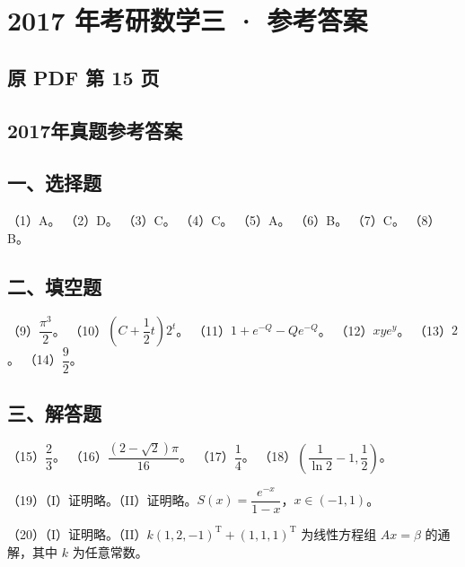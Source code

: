 \documentclass[UTF8,12pt]{ctexart}
\begin{document}
\section*{2017 年考研数学三 · 参考答案}
\subsection*{原 PDF 第 15 页}

\subsection*{2017年真题参考答案}

\subsection*{一、选择题}

（1）A。 （2）D。 （3）C。 （4）C。 （5）A。 （6）B。 （7）C。 （8）B。


\subsection*{二、填空题}

（9）\(\displaystyle \dfrac{\displaystyle \pi^3}{\displaystyle 2}\)。 （10）\(\displaystyle (C+\dfrac{\displaystyle 1}{\displaystyle 2}t)2^t\)。 （11）\(\displaystyle 1+e^{-Q}-Qe^{-Q}\)。 （12）\(\displaystyle xye^y\)。 （13）\(\displaystyle 2\)。 （14）\(\displaystyle \dfrac{\displaystyle 9}{\displaystyle 2}\)。


\subsection*{三、解答题}

（15）\(\displaystyle \dfrac{\displaystyle 2}{\displaystyle 3}\)。 （16）\(\displaystyle \dfrac{\displaystyle (2-\sqrt2)\pi}{\displaystyle 16}\)。 （17）\(\displaystyle \dfrac{\displaystyle 1}{\displaystyle 4}\)。 （18）\(\displaystyle (\dfrac{\displaystyle 1}{\displaystyle \ln2}-1,\allowbreak \dfrac{\displaystyle 1}{\displaystyle 2})\)。


（19）（I）证明略。（II）证明略。\(\displaystyle S(x)=\dfrac{\displaystyle e^{-x}}{\displaystyle 1-x}\)，\(\displaystyle x\in(-1,\allowbreak 1)\)。


（20）（I）证明略。（II）\(\displaystyle k(1,\allowbreak 2,\allowbreak -1)^{\mathrm T}+(1,\allowbreak 1,\allowbreak 1)^{\mathrm T}\) 为线性方程组 \(\displaystyle Ax=\beta\) 的通解，其中 \(\displaystyle k\) 为任意常数。
\end{document}

